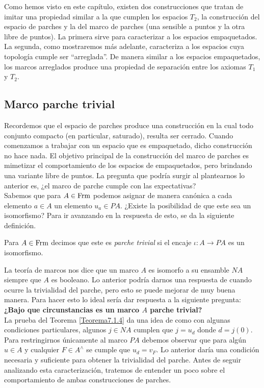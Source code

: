 Como hemos visto en este capítulo, existen dos construcciones que tratan de imitar una propiedad similar a la que cumplen los espacios $T_2$, la construcción del espacio de parches y la del marco de parches (una sensible a puntos y la otra libre de puntos). La primera sirve para caracterizar a los espacios empaquetados. La segunda, como mostraremos más adelante, caracteriza a los espacios cuya topología cumple ser ``arreglada''. De manera similar a los espacios empaquetados, los marcos arreglados produce una propiedad de separación entre los axiomas $T_1$ y $T_2$.

\subsection{Marco parche trivial}

Recordemos que el espacio de parches produce una construcción en la cual todo conjunto compacto (en particular, saturado), resulta ser cerrado. Cuando comenzamos a trabajar con un espacio que es empaquetado, dicho construcción no hace nada. El objetivo principal de la construcción del marco de parches es mimetizar el comportamiento de los espacios de empaquetados, pero brindando una variante libre de puntos. La pregunta que podría surgir al plantearnos lo anterior es, ¿el marco de parche cumple con las expectativas?\\

Sabemos que para $A\in \mathrm{Frm}$ podemos asignar de manera canónica a cada elemento $a\in A$ un elemento $u_a\in PA$. ¿Existe la posibilidad de que este sea un isomorfismo? Para ir avanzando en la respuesta de esto, se da la siguiente definición.

\begin{dfn}\label{Parche trivial}
    Para $A\in \mathrm{Frm}$ decimos que este es \emph{parche trivial} si el encaje $\iota\colon A\to PA$ es un isomorfismo.
\end{dfn}

La teoría de marcos nos dice que un marco $A$ es isomorfo a su ensamble $NA$ siempre que $A$ es booleano. Lo anterior podría darnos una respuesta de cuando ocurre la trivialidad del parche, pero esto se puede mejorar de muy buena manera. Para hacer esto lo ideal sería dar respuesta a la siguiente pregunta: \textbf{¿Bajo que circunstancias es un marco $A$ parche trivial?}\\

La prueba del Teorema \ref{Teorema7.1.4} da una idea de como con algunas condiciones particulares, algunos $j\in NA$ cumplen que $j=u_d$ donde $d=j(0)$. Para  restringirnos únicamente al marco $PA$ debemos observar que para algún $u\in A$ y cualquier $F\in A^\wedge$ se cumple que $u_d=v_F$. Lo anterior daría una condición necesaria y suficiente para obtener la trivialidad del parche. Antes de seguir analizando esta caracterización, tratemos de entender un poco sobre el comportamiento de ambas construcciones de parches.\\

